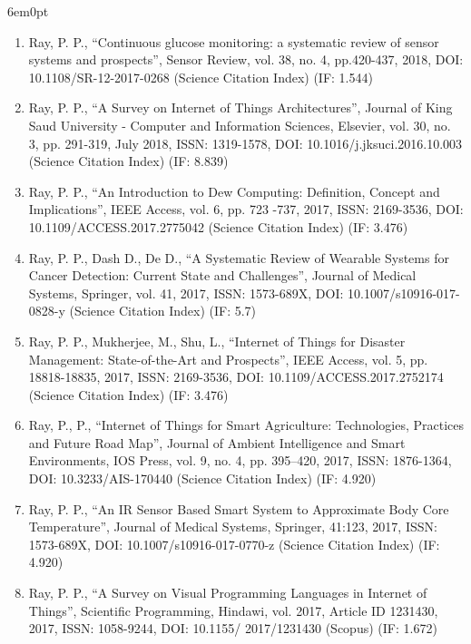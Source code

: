 \documentclass[11pt,a4paper]{moderncv}
\begin{document}
\begin{adjustwidth}{6em}{0pt}
\begin{enumerate}
		\item Ray, P. P., “Continuous glucose monitoring: a systematic review of sensor systems and prospects”, Sensor Review, vol. 38, no. 4, pp.420-437, 2018, DOI: 10.1108/SR-12-2017-0268 (Science Citation Index) (IF: 1.544)
		
		\item Ray, P. P., “A Survey on Internet of Things Architectures”, Journal of King Saud University - Computer and Information Sciences, Elsevier, vol. 30, no. 3, pp. 291-319, July 2018, ISSN: 1319-1578, DOI: 10.1016/j.jksuci.2016.10.003 (Science Citation Index) (IF: 8.839)
		
		\item Ray, P. P., “An Introduction to Dew Computing: Definition, Concept and Implications”, IEEE Access, vol. 6, pp. 723 -737, 2017, ISSN: 2169-3536, DOI: 10.1109/ACCESS.2017.2775042 (Science Citation Index) (IF: 3.476)
		
		\item Ray, P. P., Dash D., De D., “A Systematic Review of Wearable Systems for Cancer Detection: Current State and Challenges”, Journal of Medical Systems, Springer, vol. 41, 2017, ISSN: 1573-689X, DOI: 10.1007/s10916-017-0828-y (Science Citation Index) (IF: 5.7)
		
		\item Ray, P. P., Mukherjee, M., Shu, L., “Internet of Things for Disaster Management: State-of-the-Art and Prospects”, IEEE Access, vol. 5, pp. 18818-18835, 2017, ISSN: 2169-3536, DOI: 10.1109/ACCESS.2017.2752174 (Science Citation Index) (IF: 3.476)
		
		\item Ray, P., P., “Internet of Things for Smart Agriculture: Technologies, Practices and Future Road Map”, Journal of Ambient Intelligence and Smart Environments, IOS Press, vol. 9, no. 4, pp. 395–420, 2017, ISSN: 1876-1364, DOI: 10.3233/AIS-170440 (Science Citation Index) (IF: 4.920)
		
		\item Ray, P. P., “An IR Sensor Based Smart System to Approximate Body Core Temperature”, Journal of Medical Systems, Springer, 41:123, 2017, ISSN: 1573-689X, DOI: 10.1007/s10916-017-0770-z (Science Citation Index) (IF: 4.920)
		
		\item Ray, P. P., “A Survey on Visual Programming Languages in Internet of Things”, Scientific Programming, Hindawi, vol. 2017, Article ID 1231430, 2017, ISSN: 1058-9244, DOI: 10.1155/ 2017/1231430 (Scopus) (IF: 1.672)
		

\end{enumerate}
\end{adjustwidth}
\end{document}
